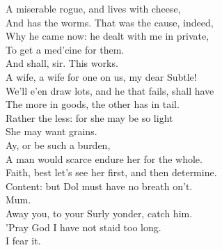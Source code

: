 \documentclass{memoir}
\begin{document}
\begin{drama*}
 A miserable rogue, and lives with cheese,\\
 And has the worms. That was the cause, indeed,\\
 Why he came now: he dealt with me in private,\\
 To get a med'cine for them.\\
\subtlespeaks {} And shall, sir. This works.\\
\facespeaks  A wife, a wife for one on us, my dear Subtle!\\
 We'll e'en draw lots, and he that fails, shall have\\
 The more in goods, the other has in tail.\\
\subtlespeaks  Rather the less: for she may be so light\\
 She may want grains.\\
\facespeaks {} Ay, or be such a burden,\\
 A man would scarce endure her for the whole.\\
\subtlespeaks  Faith, best let's see her first, and then determine.\\
\facespeaks  Content: but Dol must have no breath on't.\\
\subtlespeaks {} Mum.\\
 Away you, to your Surly yonder, catch him.\\
\facespeaks  'Pray God I have not staid too long.\\
\subtlespeaks {} I fear it.\\
\act

\scene


\end{drama*}
\end{document}
